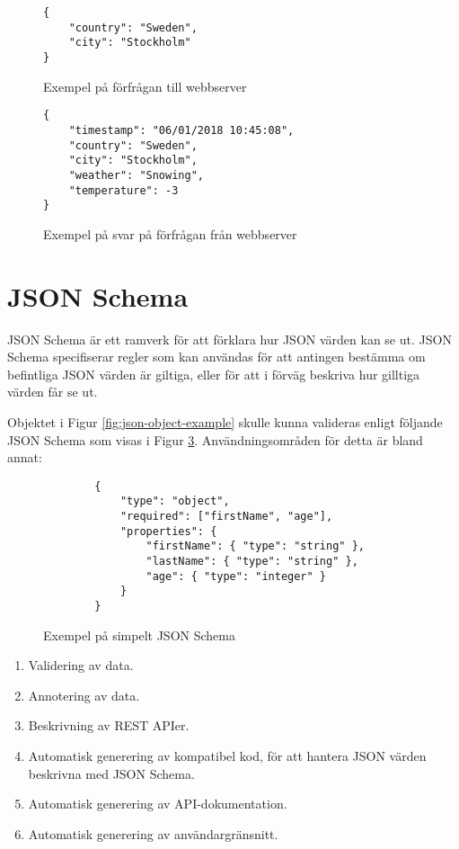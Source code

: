 \begin{figure}
	\begin{verbatim}
{
	"country": "Sweden",
	"city": "Stockholm"
}
\end{verbatim}
	\vspace{-1.7em}
	\caption{Exempel på förfrågan till webbserver}
	\label{fig:json-request-example}
\end{figure}

\begin{figure}[h]
	\begin{verbatim}
{
	"timestamp": "06/01/2018 10:45:08",
	"country": "Sweden",
	"city": "Stockholm",
	"weather": "Snowing",
	"temperature": -3
}
	\end{verbatim}
	\vspace{-1.7em}
	\caption{Exempel på svar på förfrågan från webbserver}
	\label{fig:json-response-example}
\end{figure}

\section{JSON Schema}


JSON Schema är ett ramverk för att förklara hur JSON värden kan se ut. JSON Schema specifiserar regler som kan användas för att antingen bestämma om befintliga JSON värden är giltiga, eller för att i förväg beskriva hur gilltiga värden får se ut. 

Objektet i Figur \ref{fig:json-object-example} skulle kunna valideras enligt följande JSON Schema som visas i Figur \ref{fig:json-schema-example}. Användningsområden för detta är bland annat:

\begin{figure}
	\begin{verbatim}
		{
			"type": "object",
			"required": ["firstName", "age"],
			"properties": {
				"firstName": { "type": "string" },
				"lastName": { "type": "string" },
				"age": { "type": "integer" }
			}
		}
	\end{verbatim}
	\vspace{-1.7em}
	\caption{Exempel på simpelt JSON Schema}
	\label{fig:json-schema-example}
\end{figure}


\begin{enumerate}
	\item Validering av data.
	\item Annotering av data.
	\item Beskrivning av REST APIer.
	\item Automatisk generering av kompatibel kod, för att hantera JSON värden beskrivna med JSON Schema.
	\item Automatisk generering av API-dokumentation.
	\item Automatisk generering av användargränsnitt.
\end{enumerate}

